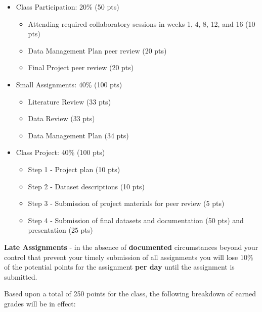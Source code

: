 \documentclass[
]{article}
\providecommand{\tightlist}{%
  \setlength{\itemsep}{0pt}\setlength{\parskip}{0pt}}
\begin{document}
\begin{itemize}
\tightlist
\item
  Class Participation: 20\% (50 pts)

  \begin{itemize}
  \tightlist
  \item
    Attending required collaboratory sessions in weeks 1, 4, 8, 12, and
    16 (10 pts)
  \item
    Data Management Plan peer review (20 pts)
  \item
    Final Project peer review (20 pts)
  \end{itemize}
\item
  Small Assignments: 40\% (100 pts)

  \begin{itemize}
  \tightlist
  \item
    Literature Review (33 pts)
  \item
    Data Review (33 pts)
  \item
    Data Management Plan (34 pts)
  \end{itemize}
\item
  Class Project: 40\% (100 pts)

  \begin{itemize}
  \tightlist
  \item
    Step 1 - Project plan (10 pts)
  \item
    Step 2 - Dataset descriptions (10 pts)
  \item
    Step 3 - Submission of project materials for peer review (5 pts)
  \item
    Step 4 - Submission of final datasets and documentation (50 pts) and
    presentation (25 pts)
  \end{itemize}
\end{itemize}

\textbf{Late Assignments} - in the absence of \textbf{documented}
circumstances beyond your control that prevent your timely submission of
all assignments you will lose 10\% of the potential points for the
assignment \textbf{per day} until the assignment is submitted.

Based upon a total of 250 points for the class, the following breakdown
of earned grades will be in effect:
\end{document}
